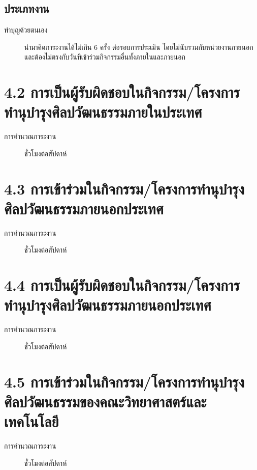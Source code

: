 \documentclass[a4paper,12pt,english]{sphinxmanual}
\begin{document}
\subsection{ประเภทงาน}
\label{\detokenize{4culture:id6}}\begin{description}
\item[{ทำบุญด้วยตนเอง}] \leavevmode
นำมาคิดภาระงานได้ไม่เกิน 6 ครั้ง ต่อรอบการประเมิน โดยไม่นับรวมกับหน่วยงานภายนอก และต้องไม่ตรงกับวันทีเข้าร่วมกิจกรรมอื่นทั้งภายในและภายนอก

\end{description}


\section{4.2 การเป็นผู้รับผิดชอบในกิจกรรม/โครงการทำนุบำรุงศิลปวัฒนธรรมภายในประเทศ}
\label{\detokenize{4culture:id7}}\label{\detokenize{4culture:id8}}\begin{description}
\item[{การคำนวณภาระงาน}]  ชั่วโมงต่อสัปดาห์

\end{description}


\section{4.3 การเข้าร่วมในกิจกรรม/โครงการทำนุบำรุงศิลปวัฒนธรรมภายนอกประเทศ}
\label{\detokenize{4culture:id9}}\label{\detokenize{4culture:id10}}\begin{description}
\item[{การคำนวณภาระงาน}]  ชั่วโมงต่อสัปดาห์

\end{description}


\section{4.4 การเป็นผู้รับผิดชอบในกิจกรรม/โครงการทำนุบำรุงศิลปวัฒนธรรมภายนอกประเทศ}
\label{\detokenize{4culture:id11}}\label{\detokenize{4culture:id12}}\begin{description}
\item[{การคำนวณภาระงาน}]  ชั่วโมงต่อสัปดาห์

\end{description}


\section{4.5 การเข้าร่วมในกิจกรรม/โครงการทำนุบำรุงศิลปวัฒนธรรมของคณะวิทยาศาสตร์และเทคโนโลยี}
\label{\detokenize{4culture:id13}}\label{\detokenize{4culture:id14}}\begin{description}
\item[{การคำนวณภาระงาน}]  ชั่วโมงต่อสัปดาห์

\end{description}
\end{document}
